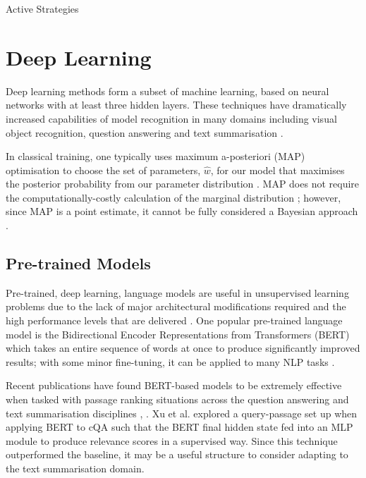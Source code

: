 \documentclass[ %
                    author={James Stephenson},
                supervisor={Dr. Edwin Simpson},
                    degree={MSc},
                     title={Project Plan: Bayesian Deep Learning For Extractive Test Summarisation},
                  subtitle={},
                      type={},
                      year={2022}]{../additions/dissertation}
\begin{document}
			Active Strategies
		
		\section{Deep Learning}
		\label{chap:literaturereview:deep}
		
		Deep learning methods form a subset of machine learning, based on neural networks with at least three hidden layers. These techniques have dramatically increased capabilities of model recognition in many domains including visual object recognition, question answering and text summarisation \cite{Lecun15, Sharma18, Azar17}. 
		

In classical training, one typically uses maximum a-posteriori (MAP) optimisation to choose the set of parameters, $\hat{w}$, for our model that maximises the posterior probability from our parameter distribution \cite{Wilson20}. MAP does not require the computationally-costly calculation of the marginal distribution \cite{Hero14}; however, since MAP is a point estimate, it cannot be fully considered a Bayesian approach \cite{Hero15}.
	

		
			\subsection{Pre-trained Models}
			\label{chap:literaturereview:deep:pretrained}
			
			Pre-trained, deep learning, language models are useful in unsupervised learning problems due to the lack of major architectural modifications required and the high performance levels that are delivered \cite{Mridha19}. One popular pre-trained language model is the Bidirectional Encoder Representations from Transformers (BERT) which takes an entire sequence of words at once to produce significantly improved results; with some minor fine-tuning, it can be applied to many NLP tasks \cite{Mridha19}.

Recent publications have found BERT-based models \cite{Devlin18} to be extremely effective when tasked with passage ranking situations across the question answering and text summarisation disciplines \cite{Xu19}, \cite{Qiao19}. Xu et al. \cite{Xu19} explored a query-passage set up when applying BERT to cQA such that the BERT final hidden state fed into an MLP module to produce relevance scores in a supervised way. Since this technique outperformed the baseline, it may be a useful structure to consider adapting to the text summarisation domain.
\end{document}
